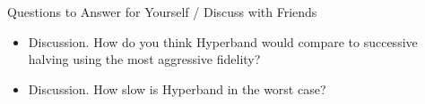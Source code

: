 %
%
%


\begin{frame}{Questions to Answer for Yourself / Discuss with Friends}

\bigskip

\begin{itemize}

    \item \alert{Discussion.} 
    How do you think Hyperband would compare to successive halving using the most aggressive fidelity?
\medskip    
    \item \alert{Discussion.} How slow is Hyperband in the worst case?

\end{itemize}

\end{frame}

